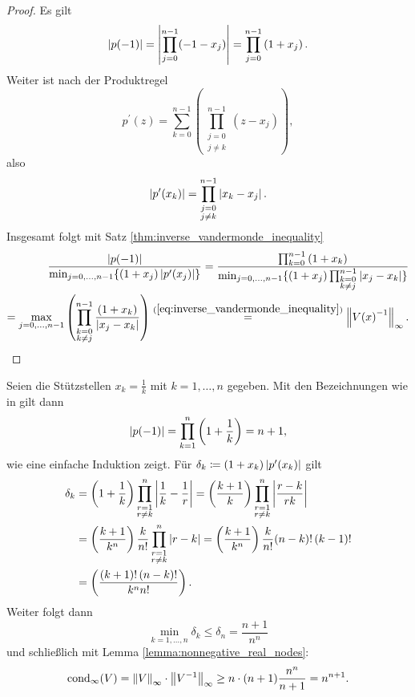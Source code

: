 \begin{proof}
    Es gilt
    \[
        \abs{p(-1)} = \abs{\prod_{j=0}^{n-1} (-1 - x_j)} = \prod_{j=0}^{n-1} \left( 1 + x_j \right).
    \]
    Weiter ist nach der Produktregel
    \[
        p^{\prime}(z) = \sum_{k=0}^{n-1} \left( \prod_{\substack{j=0\\ j\neq k}}^{n-1} \left( z - x_j \right) \right),
    \]
    also
    \[
        \abs{p^{\prime}(x_k)} = \prod_{\substack{j=0\\ j\neq k}}^{n-1} \abs{ x_k - x_j }.
    \]
    Insgesamt folgt mit Satz \ref{thm:inverse_vandermonde_inequality}
    \[
        \begin{split}
            \frac{ \abs{p(-1)}}{\min_{j=0, \dots, n-1} \{ (1+x_j) \abs{p^{\prime}(x_j)} \}}
            = \frac{\prod_{k=0}^{n-1} \left( 1 + x_k \right)}{\min_{j=0, \dots, n-1} \{ (1+x_j) \prod_{\substack{k=0\\ k\neq j}}^{n-1} \abs{ x_j - x_k }\}}\\
            = \max_{j=0, \dots, n-1} \left( \prod_{\substack{k=0\\ k \neq j}}^{n-1} \frac{\left( 1 + x_k \right)}{\abs{ x_j - x_k }} \right)
            \overset{(\ref{eq:inverse_vandermonde_inequality})}{=} \norm{\Vand{x}^{-1}}_{\infty}.
        \end{split}
    \]
\end{proof}

\begin{example}
    Seien die Stützstellen $x_k = \frac{1}{k}$ mit $k=1, \dots, n$ gegeben.
    Mit den Bezeichnungen wie in  gilt dann
    \[
        \abs{p(-1)} = \prod_{k=1}^{n} \left( 1 + \frac{1}{k} \right) = n+1,
    \]
    wie eine einfache Induktion zeigt.
    Für $\delta_k \defeq (1 + x_k) \abs{ p^{\prime}(x_k) }$ gilt
    \[
        \begin{split}
            \delta_k &= \left( 1 + \frac{1}{k} \right) \prod_{\substack{r = 1\\ r\neq k}}^n \abs{ \frac{1}{k} - \frac{1}{r} }
                     = \left( \frac{k+1}{k} \right) \prod_{\substack{r = 1\\ r\neq k}}^n \abs{ \frac{r-k}{rk}}\\
                     &= \left( \frac{k+1}{k^n} \right) \frac{k}{n!} \prod_{\substack{r = 1\\ r\neq k}}^n \abs{ r-k }
                     = \left( \frac{k+1}{k^n} \right) \frac{k}{n!} (n-k)! \, (k-1)!\\
                     &= \left( \frac{(k+1)! \, (n-k)!}{k^n n!} \right).
        \end{split}
    \]
    Weiter folgt dann
    \[
        \min_{k=1, \dots, n} \delta_k \leq \delta_n = \frac{n+1}{n^n}
    \]
    und schließlich mit Lemma \ref{lemma:nonnegative_real_nodes}:
    \[
        \cond[\infty]{V} = \norm{V}_\infty \cdot \norm{V^{-1}}_\infty \geq n \cdot (n+1) \frac{n^n}{n+1} = n^{n+1}.
    \]
\end{example}


